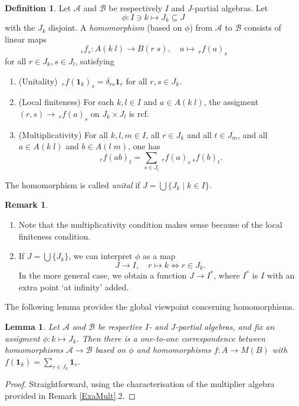 \documentclass[10pt]{article}
\newcommand{\GrDA}[3]{{}_{\;#2}#1_{#3}} %
\newcommand{\Unit}{\mathbf{1}}
\newtheorem{Lem}[Theorem]{Lemma}
\theoremstyle{definition}
\newtheorem{Def}[Theorem]{Definition}
\newtheorem{Rem}[Theorem]{Remark}
\numberwithin{equation}{section}
\begin{document}
\begin{Def}\label{DefMor} Let $\mathscr{A}$ and $\mathscr{B}$ be respectively $I$ and $J$-partial algebras. Let \[\phi: I \ni k \mapsto J_k \subseteq J\] with the $J_k$ disjoint. A \emph{homomorphism} (based on $\phi$) from $\mathscr{A}$ to $\mathscr{B}$ consists of linear maps \[\GrDA{f}{r}{s}: A(k\;l)\rightarrow B(r\;s),\quad a\mapsto \GrDA{f(a)}{r}{s}\] for all $r\in J_k, s\in J_l$, satisfying 
\begin{enumerate}[label = (\arabic*)]
\item (Unitality) $\GrDA{f(\Unit_{k})}{r}{s} = \delta_{rs}\Unit_r$ for all $r,s\in J_k$.
\item (Local finiteness) For each $k,l\in I$ and $a\in A(k\;l)$, the assigment $(r,s)\rightarrow \GrDA{f(a)}{r}{s}$ on $J_k\times J_l$ is rcf. 
\item (Multiplicativity) For all $k,l,m\in I$, all $r\in J_k$ and all $t\in J_m$, and all $a\in A(k\;l)$ and $b\in A(l\;m)$, one has \[\GrDA{f(ab)}{r}{t} = \sum_{s\in J_l} \GrDA{f(a)}{r}{s}\GrDA{f(b)}{s}{t}.\]
\end{enumerate} 
The homomorphism is called \emph{unital} if $J=\bigcup \{J_k\mid k\in I\}$. %
\end{Def}
\begin{Rem}
\begin{enumerate}
\item
Note that the multiplicativity condition makes sense because of the local finiteness condition.
\item
If $J = \bigcup\{J_k\}$, we can interpret $\phi$ as a map \[J\rightarrow I,\quad r\mapsto k \iff r\in J_k.\] In the more general case, we obtain a function $J\rightarrow I^*$, where $I^*$ is $I$ with an extra point `at infinity' added.
\end{enumerate}
\end{Rem}

The following lemma provides the global viewpoint concerning homomorphisms. 

\begin{Lem} Let $\mathscr{A}$ and $\mathscr{B}$ be respective $I$- and $J$-partial algebras, and fix an assigment $\phi: k\mapsto J_k$. Then there is a one-to-one correspondence between homomorphisms $\mathscr{A}\rightarrow \mathscr{B}$ based on $\phi$ and homomorphisms $f:A\rightarrow M(B)$ with $f(\Unit_k) = \sum_{r\in J_k} \Unit_r$. 
\end{Lem} 
\begin{proof}
Straightforward, using the characterisation of the multiplier algebra provided in Remark \ref{ExaMult}.2.
\end{proof}
\end{document}
